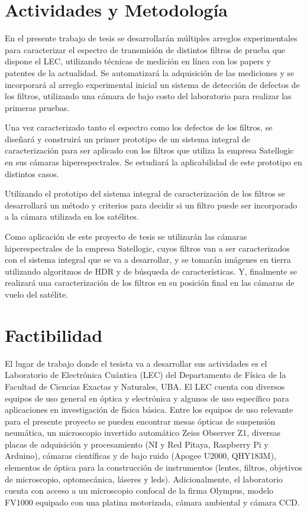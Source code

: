 \section{Actividades y Metodología}

\hspace{0.5cm}En el presente trabajo de tesis se desarrollarán múltiples 
arreglos 
experimentales para caracterizar el espectro de transmisión de distintos 
filtros de prueba que dispone el LEC, utilizando técnicas de medición en línea 
con los papers y patentes de la actualidad. Se automatizará la adquisición de 
las mediciones y se incorporará al arreglo experimental inicial un sistema de 
detección de defectos de los filtros, utilizando una cámara de bajo costo del 
laboratorio para realizar las primeras pruebas. 

Una vez caracterizado tanto el espectro como los defectos de los filtros, se 
diseñará y construirá un primer prototipo de un sistema integral de 
caracterización para ser aplicado con los filtros que utiliza la empresa 
Satellogic en sus cámaras hiperespectrales. Se estudiará la aplicabilidad de 
este prototipo en distintos casos.

Utilizando el prototipo del sistema integral de caracterización de los filtros 
se desarrollará un método y criterios para decidir si un filtro puede ser 
incorporado a la cámara utilizada en los satélites.

Como aplicación de este proyecto de tesis se utilizarán las cámaras 
hiperespectrales de la empresa Satellogic, cuyos filtros van a ser 
caracterizados con el sistema integral que se va a desarrollar, y se tomarán 
imágenes en tierra utilizando algoritmos de HDR y de búsqueda de 
características.  Y, finalmente se realizará una caracterización de los filtros 
en su posición final en las cámaras de vuelo del satélite.



\section{Factibilidad}

\hspace{0.5cm}El lugar de trabajo donde el tesista va a desarrollar sus 
actividades es el 
Laboratorio de Electrónica Cuántica (LEC) del Departamento de Física de la 
Facultad de Ciencias Exactas y Naturales, UBA. El LEC cuenta con diversos 
equipos de uso general en óptica y electrónica y algunos de uso específico para 
aplicaciones en investigación de física básica. Entre los equipos de uso 
relevante para el presente proyecto se pueden encontrar mesas ópticas de 
suspensión neumática, un microscopio invertido automático Zeiss Observer Z1, 
diversas placas de adquisición y procesamiento (NI y Red Pitaya, Raspberry Pi y 
Arduino), cámaras científicas y de bajo ruido (Apogee U2000, QHY183M), 
elementos de óptica para la construcción de instrumentos (lentes, filtros, 
objetivos de microscopio, optomecánica, láseres y leds). Adicionalmente, el 
laboratorio cuenta con acceso a un microscopio confocal de la firma Olympus, 
modelo FV1000 equipado con una platina motorizada, cámara ambiental y cámara 
CCD.
 
